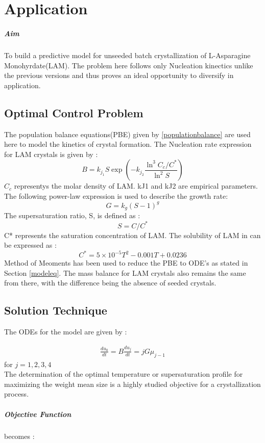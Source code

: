 \chapter{Application}

\paragraph{Aim} To build a predictive model for unseeded batch crystallization of L-Asparagine Monohyrdate(LAM). The problem here follows only Nucleation kinectics unlike the previous versions and thus proves an ideal opportunity to diversify in application.


\section{Optimal Control Problem}

The population balance equations(PBE) given by \ref{populationbalance} are used here to model the kinetics of crystal formation. The Nucleation rate expression for LAM crystals is given by\cite{lindenberg} :
\begin{equation}
B = k_{j_{1}}S\exp\left( -k_{j_{2}}\frac{\ln^{3}{C_{c}/C^{*}}}{\ln^{2}S}\right) 
\end{equation}
$C_{c}$ representys the  molar density of LAM. kJ1 and kJ2 are
empirical parameters. The following power-law expression is used to describe the growth rate\cite{nagy}\cite{nagy2}:
\begin{equation}
G = k_{g}(S-1)^{g}
\end{equation}
The supersaturation ratio, S, is defined as :
\begin{equation}
S = C/C^{*}
\end{equation}
C* represents the saturation concentration of LAM. The solubility of LAM in 
can be expressed as \cite{}:
\begin{equation}
C^{*} = 5 \times 10^{-5}T^{2} - 0.001T + 0.0236
\end{equation}
Method of Meoments has been used to reduce the PBE to ODE's as stated in Section \ref{modeleq}. The mass balance for LAM crystals also remains the same from there, with the difference being the absence of seeded crystals.\\

\section{Solution Technique}
The ODEs for the model are given by :

\begin{align}
\frac{du_{0}}{dt} = B
\frac{du_{j}}{dt} = jG\mu_{j-1}
\end{align}
for  $j = 1,2,3,4 $
\\
The determination of the optimal temperature or supersaturation profile for maximizing the weight mean size is a highly studied objective for a crystallization process.
\paragraph{Objective Function} becomes :
